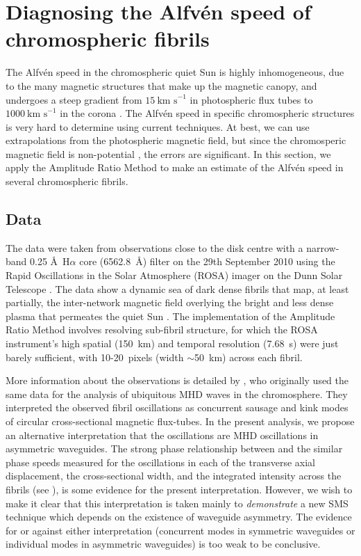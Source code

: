 \section{Diagnosing the Alfv\'{e}n speed of chromospheric fibrils}
\label{sec: fibrils}

The Alfv\'{e}n speed in the chromospheric quiet Sun is highly inhomogeneous, due to the many magnetic structures that make up the magnetic canopy, and undergoes a steep gradient from $15~\text{km~s}^{-1}$ in photospheric flux tubes to $1000~\text{km~s}^{-1}$ in the corona \citep{van_etal11}. The Alfv\'{e}n speed in specific chromospheric structures is very hard to determine using current techniques. At best, we can use extrapolations from the photospheric magnetic field, but since the chromosperic magnetic field is non-potential \citep{woo_etal99,wie_etal14}, the errors are significant.
In this section, we apply the Amplitude Ratio Method to make an estimate of the Alfv\'{e}n speed in several chromospheric fibrils.


\subsection{Data} \label{sec: data}

The data were taken from observations close to the disk centre with a narrow-band 0.25 \AA~H$\alpha$ core (6562.8~\AA) filter on the 29th September 2010 using the Rapid Oscillations in the Solar Atmosphere (ROSA) imager on the Dunn Solar Telescope \citep{jes_etal10a}. The data show a dynamic sea of dark dense fibrils that map, at least partially, the inter-network magnetic field overlying the bright and less dense plasma that permeates the quiet Sun \citep{lee_etal12}. The implementation of the Amplitude Ratio Method involves resolving sub-fibril structure, for which the ROSA instrument’s high spatial (150~km) and temporal resolution (7.68~s) were just barely sufficient, with 10-20~pixels (width $\sim$50~km) across each fibril.

More information about the observations is detailed by \cite{mor_etal12}, who originally used the same data for the analysis of ubiquitous MHD waves in the chromosphere. They interpreted the observed fibril oscillations as concurrent sausage and kink modes of circular cross-sectional magnetic flux-tubes. In the present analysis, we propose an alternative interpretation that the oscillations are MHD oscillations in asymmetric waveguides. The strong phase relationship between and the similar phase speeds measured for the oscillations in each of the transverse axial displacement, the cross-sectional width, and the integrated intensity across the fibrils (see \citealp{mor_etal12}), is some evidence for the present interpretation. However, we wish to make it clear that this interpretation is taken mainly to \textit{demonstrate} a new SMS technique which depends on the existence of waveguide asymmetry. The evidence for or against either interpretation (concurrent modes in symmetric waveguides or individual modes in asymmetric waveguides) is too weak to be conclusive.


